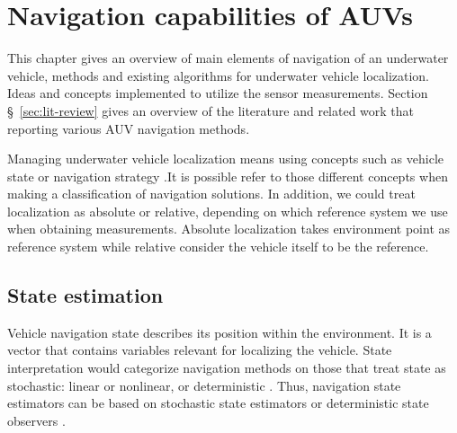 \chapter{Navigation capabilities of AUVs} \label{chap:capabilities}
This chapter gives an overview of main elements of navigation of an underwater vehicle, methods and existing algorithms for underwater vehicle localization. Ideas and concepts implemented to utilize the sensor measurements. Section \S~\ref{sec:lit-review}  gives an overview of the literature and related work that reporting various AUV navigation methods. 

Managing underwater vehicle localization means using concepts such as vehicle state or navigation strategy .It is possible refer to those different concepts when making a classification of navigation solutions. In addition, we could treat localization as absolute or relative, depending on which reference system we use when obtaining measurements. Absolute localization takes environment point as reference system while relative consider the vehicle itself to be the reference.
\section{State estimation}
Vehicle navigation state describes its position within the environment. It is a vector that contains variables relevant for localizing the vehicle. State interpretation would categorize navigation methods on those that treat state as stochastic: linear or nonlinear, or deterministic \cite{kinsey06}. Thus, navigation state estimators can be based on stochastic state estimators or deterministic state observers \cite{kinsey06}.

